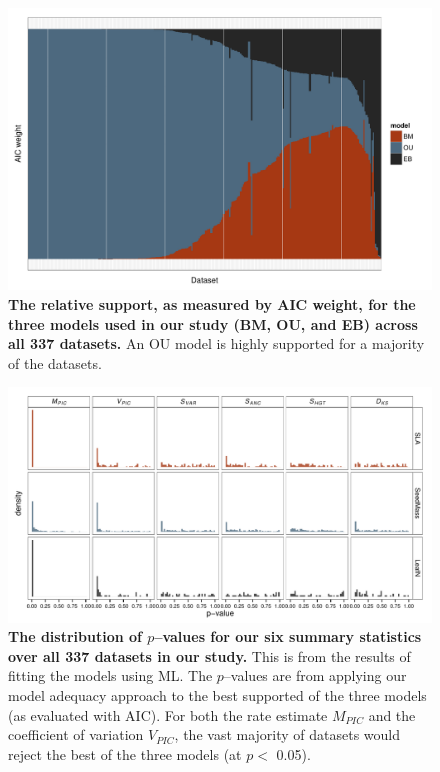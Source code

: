 \documentclass[a4paper,12pt]{article}
\begin{document}
\begin{figure}[p]
  \centering
  \includegraphics[angle=90, origin=c, scale=0.8]{figs/aic-support}
  \caption{\textbf{The relative support, as measured by AIC weight, for the three models used in our study (BM, OU, and EB) across all 337 datasets.} An OU model is highly supported for a majority of the datasets.}
  \label{fig:aic-support}
\end{figure}

\begin{figure}[p]
  \centering
  \includegraphics[angle=90, origin=c, scale=0.85]{figs/pval-hist-ml}
  \caption{\textbf{The distribution of $p$--values for our six summary statistics over all 337 datasets in our study.} This is from the results of fitting the models using ML. The $p$--values are from applying our model adequacy approach to the best supported of the three models (as evaluated with AIC). For both the rate estimate $M_{PIC}$ and the coefficient of variation $V_{PIC}$, the vast majority of datasets would reject the best of the three models (at $p<$ 0.05).}
  \label{fig:pvalues}
\end{figure}
\end{document}
